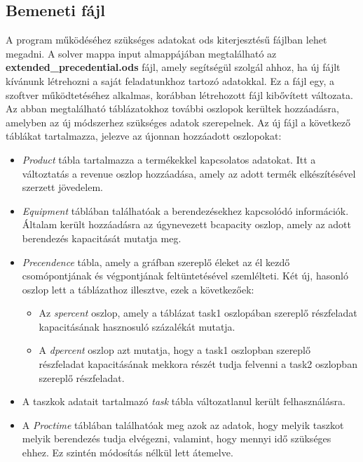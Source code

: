 \subsection{Bemeneti fájl}
A program működéséhez szükséges adatokat ods kiterjesztésű fájlban lehet megadni.
A solver mappa input almappájában megtalálható az \textbf{extended\_precedential.ods} fájl, amely segítségül szolgál ahhoz, ha új fájlt kívánunk létrehozni a saját feladatunkhoz tartozó adatokkal.
Ez a fájl egy, a szoftver működtetéséhez alkalmas, korábban létrehozott fájl kibővített változata.
Az abban megtalálható táblázatokhoz további oszlopok kerültek hozzáadásra, amelyben az új módszerhez szükséges adatok szerepelnek.
Az új fájl a következő táblákat tartalmazza, jelezve az újonnan hozzáadott oszlopokat:
\begin{itemize}
  \item \textit{Product} tábla tartalmazza a termékekkel kapcsolatos adatokat.
  Itt a változtatás a revenue oszlop hozzáadása, amely az adott termék elkészítésével szerzett jövedelem.
  \item \textit{Equipment} táblában találhatóak a berendezésekhez kapcsolódó információk.
  Általam került hozzáadásra az úgynevezett b\textunderscore capacity oszlop, amely az adott berendezés kapacitását mutatja meg.
  \item \textit{Precendence} tábla, amely a gráfban szereplő éleket az él kezdő csomópontjának és végpontjának feltüntetésével szemlélteti.
  Két új, hasonló oszlop lett a táblázathoz illesztve, ezek a következőek:
  	\begin{itemize}
  		\item Az \textit{s\textunderscore percent} oszlop, amely a táblázat task1 oszlopában szereplő részfeladat kapacitásának hasznosuló százalékát mutatja.
  		\item A \textit{d\textunderscore percent} oszlop  azt mutatja, hogy a task1 oszlopban szereplő részfeladat kapacitásának mekkora részét tudja felvenni a task2 oszlopban szereplő részfeladat.
  	\end{itemize}
  	\item A taszkok adatait tartalmazó \textit{task} tábla változatlanul került felhasználásra.
  	\item A \textit{Proctime} táblában találhatóak meg azok az adatok, hogy melyik taszkot melyik berendezés tudja elvégezni, valamint, hogy mennyi idő szükséges ehhez.
  	Ez szintén módosítás nélkül lett átemelve.
\end{itemize}

